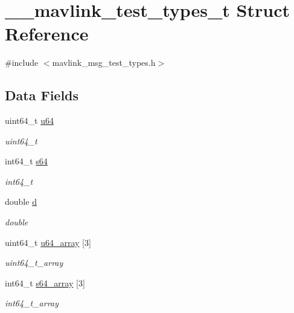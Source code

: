 \hypertarget{struct____mavlink__test__types__t}{\section{\+\_\+\+\_\+mavlink\+\_\+test\+\_\+types\+\_\+t Struct Reference}
\label{struct____mavlink__test__types__t}
}


{\ttfamily \#include $<$mavlink\+\_\+msg\+\_\+test\+\_\+types.\+h$>$}

\subsection*{Data Fields}
\begin{DoxyCompactItemize}
\item 
uint64\+\_\+t \hyperlink{struct____mavlink__test__types__t_a66346b4584997db41725685b6fd38c77}{u64}
\begin{DoxyCompactList}\small\item\em uint64\+\_\+t \end{DoxyCompactList}\item 
int64\+\_\+t \hyperlink{struct____mavlink__test__types__t_a98e07434b0458d455d1bcf634b5c80e1}{s64}
\begin{DoxyCompactList}\small\item\em int64\+\_\+t \end{DoxyCompactList}\item 
double \hyperlink{struct____mavlink__test__types__t_a12ac797d1a0b3e329000fe19bcafb992}{d}
\begin{DoxyCompactList}\small\item\em double \end{DoxyCompactList}\item 
uint64\+\_\+t \hyperlink{struct____mavlink__test__types__t_a80ac28d60682ecfce074b82a85395918}{u64\+\_\+array} \mbox{[}3\mbox{]}
\begin{DoxyCompactList}\small\item\em uint64\+\_\+t\+\_\+array \end{DoxyCompactList}\item 
int64\+\_\+t \hyperlink{struct____mavlink__test__types__t_a2990e14e7cc1a05192af964200690fd7}{s64\+\_\+array} \mbox{[}3\mbox{]}
\begin{DoxyCompactList}\small\item\em int64\+\_\+t\+\_\+array \end{DoxyCompactList}\item 

\end{DoxyCompactItemize}
